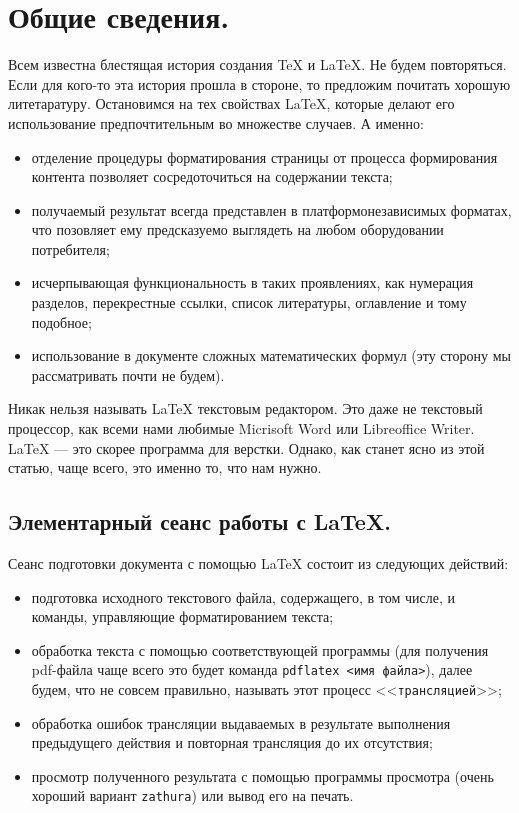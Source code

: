 
\usepackage{amssymb}
\usepackage{paralist} %


\chapter{Общие сведения.}

Всем известна блестящая история создания \TeX{} и \LaTeX{}. Не будем повторяться. Если
для кого-то эта история прошла в стороне, то предложим почитать хорошую литетаратуру.
Остановимся на тех свойствах \LaTeX{}, которые делают его использование предпочтительным
во множестве случаев. А именно:
\begin{itemize}
\item отделение процедуры форматирования страницы от процесса формирования контента 
позволяет сосредоточиться на содержании текста;
\item получаемый результат всегда представлен в платформонезависимых форматах, что 
позовляет ему предсказуемо выглядеть на любом оборудовании потребителя;
\item исчерпывающая функциональность в таких проявлениях, как нумерация разделов, 
перекрестные ссылки, список литературы, оглавление и тому подобное;
\item использование в документе сложных математических формул (эту сторону мы 
рассматривать почти не будем).
\end{itemize}
Никак нельзя называть \LaTeX{} текстовым редактором. Это даже не текстовый процессор, 
как всеми нами любимые Micrisoft Word или Libreoffice Writer. \LaTeX{} --- это скорее 
программа для верстки. Однако, как станет ясно из этой статью, чаще всего, это именно то,
что нам нужно. 
\section{Элементарный сеанс работы с \LaTeX.}
Сеанс подготовки документа с помощью \LaTeX{} состоит из следующих действий:
\begin{itemize}
\item подготовка исходного текстового файла, содержащего, в том числе, и команды, 
управляющие форматированием текста;
\item \sloppy обработка текста с помощью соответствующей программы (для получения pdf-файла 
чаще всего это будет команда \verb|pdflatex <имя файла>|), далее будем, что не совсем
правильно, называть этот процесс <<\verb|трансляцией|>>;
\item обработка ошибок трансляции выдаваемых в результате выполнения предыдущего 
действия и повторная трансляция до их отсутствия;
\item просмотр полученного результата с помощью программы просмотра (очень хороший 
вариант \verb|zathura|) или вывод его на печать.
\end{itemize}

